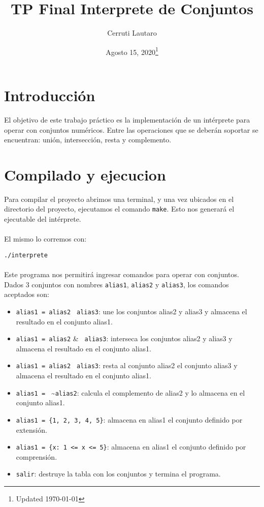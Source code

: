 \documentclass[]{article}
\begin{document}
	
\title{TP Final Interprete de Conjuntos}
\author{Cerruti Lautaro}
\date{Agosto 15, 2020\footnote{Updated \today}}
\maketitle
\newpage

\section{Introducción}
El objetivo de este trabajo práctico es la implementación de un intérprete para operar con
conjuntos numéricos. Entre las operaciones que se deberán soportar se encuentran: unión,
intersección, resta y complemento.

\section{Compilado y ejecucion}
Para compilar el proyecto abrimos una terminal, y una vez ubicados en el directorio del proyecto, ejecutamos el comando \verb|make|. Esto nos generará el ejecutable del intérprete.\\\\
El mismo lo corremos con: 

\verb|./interprete|
\\\\Este programa nos permitirá ingresar comandos para operar con conjuntos. Dados 3 conjuntos con nombres \verb|alias1|, \verb|alias2| y \verb|alias3|, los comandos aceptados son:
 \begin{itemize}
 	\item \verb|alias1 = alias2| \textbar \verb| alias3|: une los conjuntos alias2 y alias3 y almacena el resultado en el conjunto alias1.
 	\item \verb|alias1 = alias2| \& \verb| alias3|: interseca los conjuntos alias2 y alias3 y almacena el resultado en el conjunto alias1.
 	\item \verb|alias1 = alias2| \textendash \verb| alias3|: resta al conjunto alias2 el conjunto alias3 y almacena el resultado en el conjunto alias1.
 	\item \verb|alias1 = | \textasciitilde \verb|alias2|: calcula el complemento de alias2 y lo almacena en el conjunto alias1.
 	\item \verb|alias1 = {1, 2, 3, 4, 5}|: almacena en alias1 el conjunto definido por extensión.
 	\item \verb|alias1 = {x: 1 <= x <= 5}|: almacena en alias1 el conjunto definido por comprensión.
 	\item \verb|salir|: destruye la tabla con los conjuntos y termina el programa.
 \end{itemize}
\end{document}
